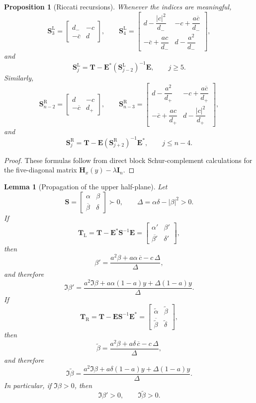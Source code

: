 \documentclass[11pt]{article}
\numberwithin{equation}{section}
\newtheorem{proposition}[theorem]{Proposition}
\newtheorem{lemma}[theorem]{Lemma}
\newcommand{\I}{\mathbf I}
\newcommand{\Hmat}{\mathbf H}
\begin{document}
\begin{proposition}[Riccati recursions]\label{prop:schur-rec}
Whenever the indices are meaningful,
\[
\mathbf S_3^{\mathrm L}
=
\begin{bmatrix}
d_- & -c\\
-\overline c & d
\end{bmatrix},
\qquad
\mathbf S_4^{\mathrm L}
=
\begin{bmatrix}
d-\dfrac{|c|^2}{d_-} & -c+\dfrac{a\overline c}{d_-}\\[3mm]
-\overline c+\dfrac{ac}{d_-} & d-\dfrac{a^2}{d_-}
\end{bmatrix},
\]
and
\[
\mathbf S_j^{\mathrm L}
=
\mathbf T-\mathbf E^*(\mathbf S_{j-2}^{\mathrm L})^{-1}\mathbf E,
\qquad
j\ge5.
\]
Similarly,
\[
\mathbf S_{n-2}^{\mathrm R}
=
\begin{bmatrix}
d & -c\\
-\overline c & d_+
\end{bmatrix},
\qquad
\mathbf S_{n-3}^{\mathrm R}
=
\begin{bmatrix}
d-\dfrac{a^2}{d_+} & -c+\dfrac{a\overline c}{d_+}\\[3mm]
-\overline c+\dfrac{ac}{d_+} & d-\dfrac{|c|^2}{d_+}
\end{bmatrix},
\]
and
\[
\mathbf S_j^{\mathrm R}
=
\mathbf T-\mathbf E(\mathbf S_{j+2}^{\mathrm R})^{-1}\mathbf E^*,
\qquad
j\le n-4.
\]
\end{proposition}

\begin{proof}
These formulas follow from direct block Schur-complement calculations for the
five-diagonal matrix \(\Hmat_x(y)-\lambda\I_n\).
\end{proof}

\begin{lemma}[Propagation of the upper half-plane]\label{lem:propagate}
Let
\[
\mathbf S=
\begin{bmatrix}
\alpha & \beta\\
\overline\beta & \delta
\end{bmatrix}\succ0,
\qquad
\Delta=\alpha\delta-|\beta|^2>0.
\]
If
\[
\mathbf T_{\mathrm L}
=
\mathbf T-\mathbf E^*\mathbf S^{-1}\mathbf E
=
\begin{bmatrix}
\alpha' & \beta'\\
\overline{\beta'} & \delta'
\end{bmatrix},
\]
then
\[
\beta'
=
\frac{a^2\beta+a\alpha\,\overline c-c\,\Delta}{\Delta},
\]
and therefore
\[
\Im\beta'
=
\frac{a^2\Im\beta+a\alpha(1-a)y+\Delta(1-a)y}{\Delta}.
\]
If
\[
\mathbf T_{\mathrm R}
=
\mathbf T-\mathbf E\mathbf S^{-1}\mathbf E^*
=
\begin{bmatrix}
\widetilde\alpha & \widetilde\beta\\
\overline{\widetilde\beta} & \widetilde\delta
\end{bmatrix},
\]
then
\[
\widetilde\beta
=
\frac{a^2\beta+a\delta\,\overline c-c\,\Delta}{\Delta},
\]
and therefore
\[
\Im\widetilde\beta
=
\frac{a^2\Im\beta+a\delta(1-a)y+\Delta(1-a)y}{\Delta}.
\]
In particular, if \(\Im\beta>0\), then
\[
\Im\beta'>0,
\qquad
\Im\widetilde\beta>0.
\]
\end{lemma}
\end{document}
